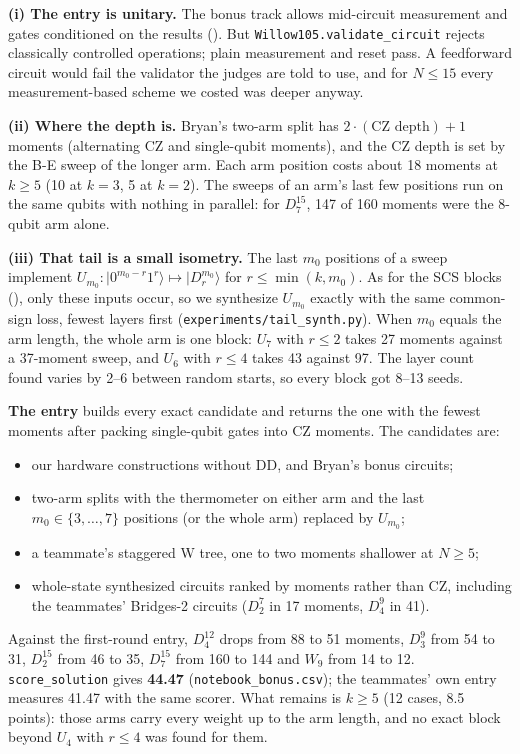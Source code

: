 \documentclass[11pt]{scrartcl}
\newcommand{\ket}[1]{\lvert #1\rangle}
\newcommand{\D}[2]{D^{#1}_{#2}}
\newcommand{\CZ}{\ensuremath{\mathrm{CZ}}}
\newcommand{\file}[1]{\texttt{\small #1}}
\begin{document}
\textbf{(i) The entry is unitary.} The bonus track allows mid-circuit measurement and gates
conditioned on the results (). But \texttt{Willow105.validate\_circuit} rejects
classically controlled operations; plain measurement and reset pass. A feedforward circuit would
fail the validator the judges are told to use, and for $N\le15$ every measurement-based scheme we
costed was deeper anyway.

\textbf{(ii) Where the depth is.} Bryan's two-arm split has $2\cdot(\text{CZ depth})+1$ moments
(alternating \CZ{} and single-qubit moments), and the \CZ{} depth is set by the B-E sweep of the
longer arm. Each arm position costs about 18 moments at $k\ge5$ (10 at $k=3$, 5 at $k=2$). The sweeps
of an arm's last few positions run on the same qubits with nothing in parallel: for $\D{15}7$, 147
of 160 moments were the 8-qubit arm alone.

\textbf{(iii) That tail is a small isometry.} The last $m_0$ positions of a sweep implement
$U_{m_0}\colon\ket{0^{m_0-r}1^r}\mapsto\ket{\D{m_0}r}$ for $r\le\min(k,m_0)$. As for the SCS blocks
(), only these inputs occur, so we synthesize $U_{m_0}$ exactly with the same
common-sign loss, fewest layers first (\file{experiments/tail\_synth.py}). When $m_0$ equals the arm
length, the whole arm is one block: $U_7$ with $r\le2$ takes 27 moments against a 37-moment sweep,
and $U_6$ with $r\le4$ takes 43 against 97. The layer count found varies by 2--6 between random
starts, so every block got 8--13 seeds.

\textbf{The entry} builds every exact candidate and returns the one with the fewest moments after
packing single-qubit gates into \CZ{} moments. The candidates are:
\begin{itemize}
  \item our hardware constructions without DD, and Bryan's bonus circuits;
  \item two-arm splits with the thermometer on either arm and the last $m_0\in\{3,\dots,7\}$
        positions (or the whole arm) replaced by $U_{m_0}$;
  \item a teammate's staggered W tree, one to two moments shallower at $N\ge5$;
  \item whole-state synthesized circuits ranked by moments rather than \CZ{}, including the
        teammates' Bridges-2 circuits ($\D72$ in 17 moments, $\D94$ in 41).
\end{itemize}
Against the first-round entry, $\D{12}4$ drops from 88 to 51 moments, $\D93$ from 54 to 31,
$\D{15}2$ from 46 to 35, $\D{15}7$ from 160 to 144 and $W_9$ from 14 to 12. \file{score\_solution}
gives \textbf{44.47} (\file{notebook\_bonus.csv}); the teammates' own entry measures 41.47 with the
same scorer. What remains is $k\ge5$ (12 cases, 8.5 points): those arms carry every weight up to the
arm length, and no exact block beyond $U_4$ with $r\le4$ was found for them.
\end{document}

